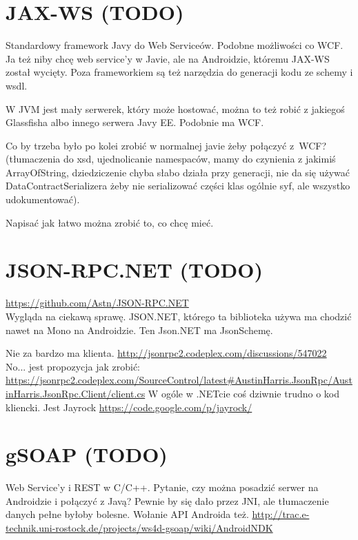 \section{JAX-WS (TODO)}
Standardowy framework Javy do Web Serviceów. Podobne możliwości co WCF\@. Ja też niby chcę web service'y w Javie, ale na Androidzie, któremu JAX-WS został wycięty.
Poza frameworkiem są też narzędzia do generacji kodu ze schemy i wsdl.

W JVM jest mały serwerek, który może hostować, można to też robić z jakiegoś Glassfisha albo innego serwera Javy EE\@. Podobnie ma WCF.

Co by trzeba było po kolei zrobić w normalnej javie żeby połączyć z~WCF? (tłumaczenia do xsd, ujednolicanie namespaców, mamy do czynienia z jakimiś ArrayOfString, dziedziczenie chyba słabo działa przy generacji, nie da się używać DataContractSerializera żeby nie serializować części klas ogólnie syf, ale wszystko udokumentować). 

Napisać jak łatwo można zrobić to, co chcę mieć.



\section{JSON-RPC.NET (TODO)}
\label{json-rpc-net}
\url{https://github.com/Astn/JSON-RPC.NET} \\
Wygląda na ciekawą sprawę. JSON.NET, którego ta biblioteka używa ma chodzić nawet na Mono na Androidzie. Ten Json.NET ma JsonSchemę.

Nie za bardzo ma klienta. \url{http://jsonrpc2.codeplex.com/discussions/547022} \\
No... jest propozycja jak zrobić: \url{https://jsonrpc2.codeplex.com/SourceControl/latest#AustinHarris.JsonRpc/AustinHarris.JsonRpc.Client/client.cs}
W ogóle w .NETcie coś dziwnie trudno o kod kliencki. Jest Jayrock \url{https://code.google.com/p/jayrock/}


\section{gSOAP (TODO)}
Web Service'y i REST w C/C++. Pytanie, czy można posadzić serwer na Androidzie i połączyć z Javą?
Pewnie by się dało przez JNI, ale tłumaczenie danych pełne byłoby bolesne. Wołanie API Androida też.
\url{http://trac.e-technik.uni-rostock.de/projects/ws4d-gsoap/wiki/AndroidNDK}\\ 



